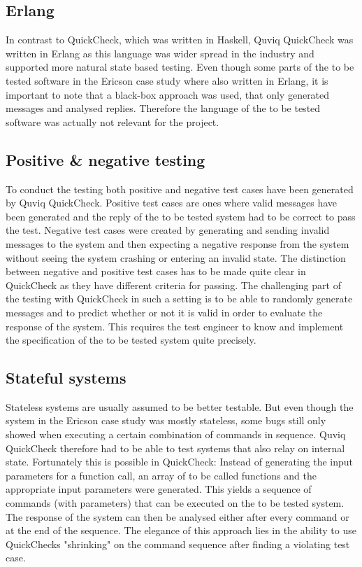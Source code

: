 \documentclass[a4paper, 12pt]{article} %
\begin{document}
\subsection{Erlang}

In contrast to QuickCheck, which was written in Haskell, Quviq QuickCheck was written in Erlang as this language was wider spread in the industry and supported more natural state based testing. Even though some parts of the to be tested software in the Ericson case study where also written in Erlang, it is important to note that a black-box approach was used, that only generated messages and analysed replies. Therefore the language of the to be tested software was actually not relevant for the project. \cite{Arts06} 

\subsection{Positive \& negative testing}

To conduct the testing both positive and negative test cases have been generated by Quviq QuickCheck. Positive test cases are ones where valid messages have been generated and the reply of the to be tested system had to be correct to pass the test. Negative test cases were created by generating and sending invalid messages to the system and then expecting a negative response from the system without seeing the system crashing or entering an invalid state. The distinction between negative and positive test cases has to be made quite clear in QuickCheck as they have different criteria for passing. The challenging part of the testing with QuickCheck in such a setting is to be able to randomly generate messages and to predict whether or not it is valid in order to evaluate the response of the system. This requires the test engineer to know and implement the specification of the to be tested system quite precisely. \cite{Arts06}

\subsection{Stateful systems}

Stateless systems are usually assumed to be better testable. But even though the system in the Ericson case study was mostly stateless, some bugs still only showed when executing a certain combination of commands in sequence. Quviq QuickCheck therefore had to be able to test systems that also relay on internal state. Fortunately this is possible in QuickCheck: Instead of generating the input parameters for a function call, an array of to be called functions and the appropriate input parameters were generated. This yields a sequence of commands (with parameters) that can be executed on the to be tested system. The response of the system can then be analysed either after every command or at the end of the sequence. The elegance of this approach lies in the ability to use QuickChecks "shrinking" on the command sequence after finding a violating test case. \cite{Arts06}
\end{document}

